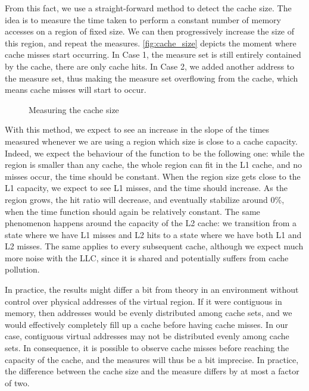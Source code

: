 \documentclass[a4paper,11pt,oneside]{report}
\begin{document}
From this fact, we use a straight-forward method to detect the cache size. The idea is to measure the time taken to perform a constant number of memory accesses on a region of fixed size. We can then progressively increase the size of this region, and repeat the measures. \autoref{fig:cache_size} depicts the moment where cache misses start occurring. In Case 1, the measure set is still entirely contained by the cache, there are only cache hits. In Case 2, we added another address to the measure set, thus making the measure set overflowing from the cache, which means cache misses will start to occur.

\begin{figure}
    \centering
    \caption{Measuring the cache size}
    \label{fig:cache_size}
\end{figure}

With this method, we expect to see an increase in the slope of the times measured whenever we are using a region which size is close to a cache capacity. Indeed, we expect the behaviour of the function to be the following one: while the region is smaller than any cache, the whole region can fit in the L1 cache, and no misses occur, the time should be constant. When the region size gets close to the L1 capacity, we expect to see L1 misses, and the time should increase. As the region grows, the hit ratio will decrease, and eventually stabilize around 0\%, when the time function should again be relatively constant. The same phenomenon happens around the capacity of the L2 cache: we transition from a state where we have L1 misses and L2 hits to a state where we have both L1 and L2 misses. The same applies to every subsequent cache, although we expect much more noise with the LLC, since it is shared and potentially suffers from cache pollution.

In practice, the results might differ a bit from theory in an environment without control over physical addresses of the virtual region. If it were contiguous in memory, then addresses would be evenly distributed among cache sets, and we would effectively completely fill up a cache before having cache misses. In our case, contiguous virtual addresses may not be distributed evenly among cache sets. In consequence, it is possible to observe cache misses before reaching the capacity of the cache, and the measures will thus be a bit imprecise. In practice, the difference between the cache size and the measure differs by at most a factor of two.
\end{document}
